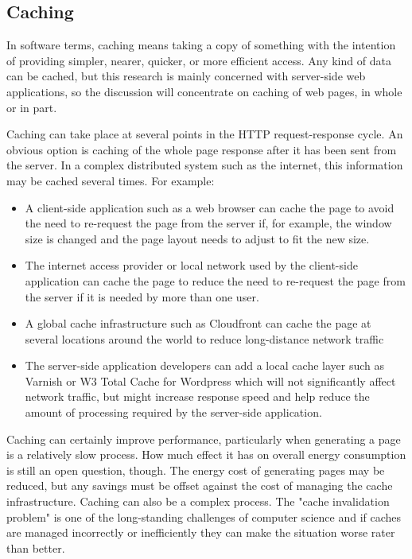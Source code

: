 \subsection{Caching}
In software terms, caching means taking a copy of something with the intention of providing simpler, nearer, quicker, or more efficient access. Any kind of data can be cached, but this research is mainly concerned with server-side web applications, so the discussion will concentrate on caching of web pages, in whole or in part.

Caching can take place at several points in the HTTP request-response cycle. An obvious option is caching of the whole page response after it has been sent from the server. In a complex distributed system such as the internet, this information may be cached several times. For example:
\begin{itemize}
    \item A client-side application such as a web browser can cache the page to avoid the need to re-request the page from the server if, for example, the window size is changed and the page layout needs to adjust to fit the new size.
    \item The internet access provider or local network used by the client-side application can cache the page to reduce the need to re-request the page from the server if it is needed by more than one user.
    \item A global cache infrastructure such as Cloudfront  can cache the page at several locations around the world to reduce long-distance network traffic
    \item The server-side application developers can add a local cache layer such as Varnish  or W3 Total Cache for Wordpress \citep{BoldGrid2022} which will not significantly affect network traffic, but might increase response speed and help reduce the amount of processing required by the server-side application.
\end{itemize}

Caching can certainly improve performance, particularly when generating a page is a relatively slow process. How much effect it has on overall energy consumption is still an open question, though. The energy cost of generating pages may be reduced, but any savings must be offset against the cost of managing the cache infrastructure. Caching can also be a complex process. The "cache invalidation problem" is one of the long-standing challenges of computer science  and if caches are managed incorrectly or inefficiently they can make the situation worse rater than better.

